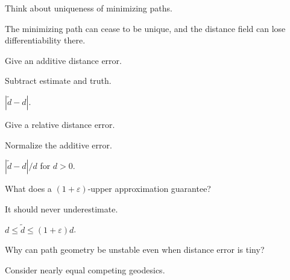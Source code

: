 \begin{hint}
Think about uniqueness of minimizing paths.
\end{hint}

\begin{solution}
The minimizing path can cease to be unique, and the distance field can lose differentiability there.
\end{solution}

\begin{exercise}\label{exr:vii38-17}
Give an additive distance error.
\end{exercise}

\begin{hint}
Subtract estimate and truth.
\end{hint}

\begin{solution}
\(|\widetilde d-d|\).
\end{solution}

\begin{exercise}\label{exr:vii38-18}
Give a relative distance error.
\end{exercise}

\begin{hint}
Normalize the additive error.
\end{hint}

\begin{solution}
\(|\widetilde d-d|/d\) for \(d>0\).
\end{solution}

\begin{exercise}\label{exr:vii38-19}
What does a \((1+\varepsilon)\)-upper approximation guarantee?
\end{exercise}

\begin{hint}
It should never underestimate.
\end{hint}

\begin{solution}
\(d\le\widetilde d\le(1+\varepsilon)d\).
\end{solution}

\begin{exercise}\label{exr:vii38-20}
Why can path geometry be unstable even when distance error is tiny?
\end{exercise}

\begin{hint}
Consider nearly equal competing geodesics.
\end{hint}

